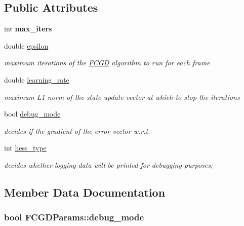 \subsection*{Public Attributes}
\begin{DoxyCompactItemize}
\item 
\hypertarget{structFCGDParams_a2ec13a6afed0f9bd73a5db1a02694ad6}{int {\bfseries max\-\_\-iters}}\label{structFCGDParams_a2ec13a6afed0f9bd73a5db1a02694ad6}

\item 
\hypertarget{structFCGDParams_abc7551f94c4a06943476c8e08eb5107d}{double \hyperlink{structFCGDParams_abc7551f94c4a06943476c8e08eb5107d}{epsilon}}\label{structFCGDParams_abc7551f94c4a06943476c8e08eb5107d}

\begin{DoxyCompactList}\small\item\em maximum iterations of the \hyperlink{classFCGD}{F\-C\-G\-D} algorithm to run for each frame \end{DoxyCompactList}\item 
\hypertarget{structFCGDParams_a06e6a67f6288c40b1d8ad4d92a1f2e2a}{double \hyperlink{structFCGDParams_a06e6a67f6288c40b1d8ad4d92a1f2e2a}{learning\-\_\-rate}}\label{structFCGDParams_a06e6a67f6288c40b1d8ad4d92a1f2e2a}

\begin{DoxyCompactList}\small\item\em maximum L1 norm of the state update vector at which to stop the iterations \end{DoxyCompactList}\item 
bool \hyperlink{structFCGDParams_aae17aaeaf00be8ed76c3cac9437c7500}{debug\-\_\-mode}
\begin{DoxyCompactList}\small\item\em decides if the gradient of the error vector w.\-r.\-t. \end{DoxyCompactList}\item 
int \hyperlink{structFCGDParams_a1ad5227e27a72d4d7edda8d68ba559e8}{hess\-\_\-type}
\begin{DoxyCompactList}\small\item\em decides whether logging data will be printed for debugging purposes; \end{DoxyCompactList}\end{DoxyCompactItemize}


\subsection{Member Data Documentation}
\hypertarget{structFCGDParams_aae17aaeaf00be8ed76c3cac9437c7500}{
\subsubsection[{debug\-\_\-mode}]{\setlength{\rightskip}{0pt plus 5cm}bool F\-C\-G\-D\-Params\-::debug\-\_\-mode}}\label{structFCGDParams_aae17aaeaf00be8ed76c3cac9437c7500}


